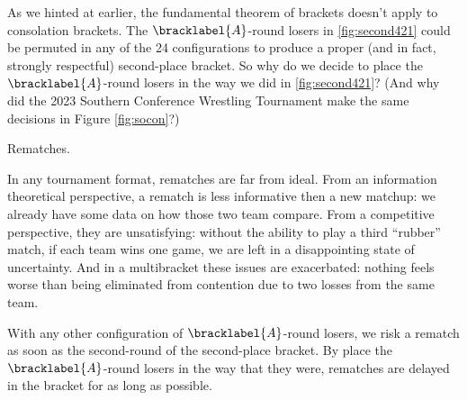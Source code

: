 {    As we hinted at earlier, the fundamental theorem of brackets doesn't apply to consolation brackets. The $\bracklabel{A}$-round losers in \ref{fig:second421} could be permuted in any of the 24 configurations to produce a proper (and in fact, strongly respectful) second-place bracket. So why do we decide to place the $\bracklabel{A}$-round losers in the way we did in \ref{fig:second421}? (And why did the 2023 Southern Conference Wrestling Tournament make the same decisions in Figure \ref{fig:socon}?)
    
    Rematches.

    In any tournament format, rematches are far from ideal. From an information theoretical perspective, a rematch is less informative then a new matchup: we already have some data on how those two team compare. From a competitive perspective, they are unsatisfying: without the ability to play a third ``rubber'' match, if each team wins one game, we are left in a disappointing state of uncertainty. And in a multibracket these issues are exacerbated: nothing feels worse than being eliminated from contention due to two losses from the same team.

    With any other configuration of $\bracklabel{A}$-round losers, we risk a rematch as soon as the second-round of the second-place bracket. By place the $\bracklabel{A}$-round losers in the way that they were, rematches are delayed in the bracket for as long as possible.    

}